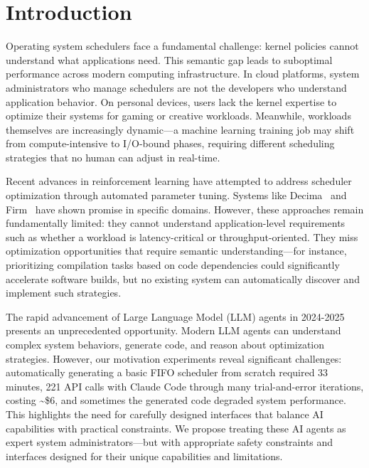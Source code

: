 \section{Introduction}

Operating system schedulers face a fundamental challenge: kernel policies cannot understand what applications need. This semantic gap leads to suboptimal performance across modern computing infrastructure. In cloud platforms, system administrators who manage schedulers are not the developers who understand application behavior. On personal devices, users lack the kernel expertise to optimize their systems for gaming or creative workloads. Meanwhile, workloads themselves are increasingly dynamic—a machine learning training job may shift from compute-intensive to I/O-bound phases, requiring different scheduling strategies that no human can adjust in real-time.

Recent advances in reinforcement learning have attempted to address scheduler optimization through automated parameter tuning. Systems like Decima~\cite{mao2019decima} and Firm~\cite{qiu2020firm} have shown promise in specific domains. However, these approaches remain fundamentally limited: they cannot understand application-level requirements such as whether a workload is latency-critical or throughput-oriented. They miss optimization opportunities that require semantic understanding—for instance, prioritizing compilation tasks based on code dependencies could significantly accelerate software builds, but no existing system can automatically discover and implement such strategies.

The rapid advancement of Large Language Model (LLM) agents in 2024-2025 presents an unprecedented opportunity. Modern LLM agents can understand complex system behaviors, generate code, and reason about optimization strategies. However, our motivation experiments reveal significant challenges: automatically generating a basic FIFO scheduler from scratch required 33 minutes, 221 API calls with Claude Code through many trial-and-error iterations, costing \textasciitilde\$6, and sometimes the generated code degraded system performance. This highlights the need for carefully designed interfaces that balance AI capabilities with practical constraints. We propose treating these AI agents as expert system administrators—but with appropriate safety constraints and interfaces designed for their unique capabilities and limitations.

